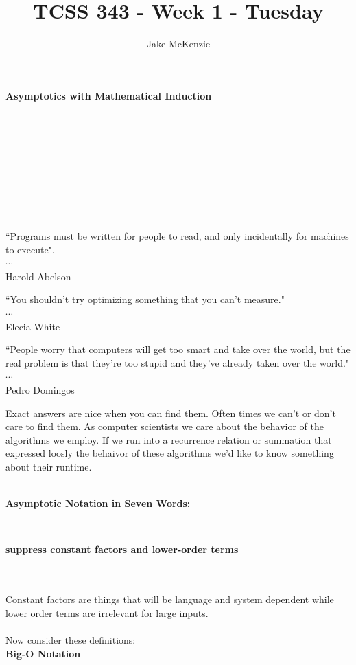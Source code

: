 \documentclass[12pt]{article}
\begin{document}
\title{TCSS 343 - Week 1 - Tuesday}
\author{Jake McKenzie}
\maketitle
\noindent\centerline{\textbf{Asymptotics with Mathematical Induction}}\\\\\\\\\\\\\\\\
\begin{center}
    ``Programs must be written for people to read, and only incidentally for machines to execute". \\$\cdots$\\ Harold Abelson
\end{center}
\begin{center}
    ``You shouldn't try optimizing something that you can't measure." \\$\cdots$\\ Elecia White
\end{center}
\begin{center}
    ``People worry that computers will get too smart and take over the world, but the real problem is that they're too stupid and they've already taken over the world." \\$\cdots$\\ Pedro Domingos
\end{center}
\newpage
Exact answers are nice when you can find them. Often times we can't or don't care to find them. As computer scientists we care about the behavior of the algorithms we employ. If we run into a recurrence relation or summation that expressed loosly the behaivor of these algorithms we'd like to know something about their runtime.\\\\
\centerline{\textbf{Asymptotic Notation in Seven Words:}}\\
\centerline{\textbf{suppress constant factors and lower-order terms}}\\\\
Constant factors are things that will be language and system dependent while lower order terms are irrelevant for large inputs.\\\\
Now consider these definitions:\\
\textbf{Big-O Notation}\\
\end{document}
